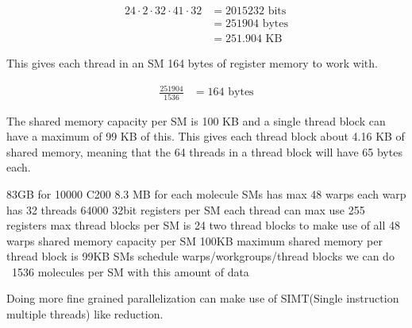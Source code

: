 \begin{equation}
\begin{split}
  24 \cdot 2 \cdot 32 \cdot 41 \cdot 32 &= 2015232 \text{ bits}\\
  &= 251904 \text{ bytes}\\
  &= 251.904 \text{ KB}
\end{split}
\end{equation}

This gives each thread in an SM 164 bytes of register memory to work with.

\begin{equation}
\begin{split}
  \frac{251904}{1536} &= 164 \text{ bytes}
\end{split}
\end{equation}

The shared memory capacity per SM is 100 KB and a single thread block can have a maximum of 99 KB of this. This gives each thread block about 4.16 KB of shared memory, meaning that the 64 threads in a thread block will have 65 bytes each.








83GB for 10000 C200
8.3 MB for each molecule
SMs has max 48 warps
each warp has 32 threads
64000 32bit registers per SM
each thread can max use 255 registers
max thread blocks per SM is 24
two thread blocks to make use of all 48 warps
shared memory capacity per SM 100KB
maximum shared memory per thread block is 99KB
SMs schedule warps/workgroups/thread blocks
we can do ~1536 molecules per SM with this amount of data




Doing more fine grained parallelization can make use of SIMT(Single instruction multiple threads) like reduction.
